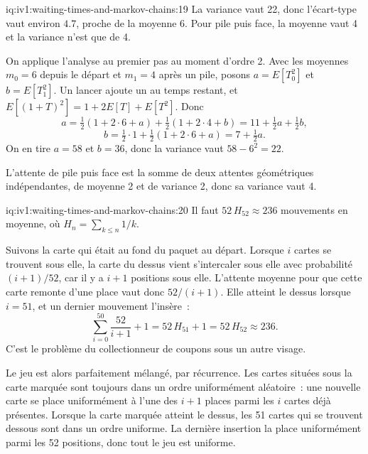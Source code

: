 \begin{solution}{iq:iv1:waiting-times-and-markov-chains:19}
La variance vaut 22, donc l'écart-type vaut environ $4.7$, proche de la moyenne 6. Pour pile puis face, la moyenne vaut 4 et la variance n'est que de 4.

On applique l'analyse au premier pas au moment d'ordre 2. Avec les moyennes $m_0 = 6$ depuis le départ et $m_1 = 4$ après un pile, posons $a = E[T_0^2]$ et $b = E[T_1^2]$. Un lancer ajoute un au temps restant, et $E[(1 + T)^2] = 1 + 2E[T] + E[T^2]$. Donc
\[
a = \tfrac12(1 + 2 \cdot 6 + a) + \tfrac12(1 + 2 \cdot 4 + b) = 11 + \tfrac12 a + \tfrac12 b,
\]
\[
b = \tfrac12 \cdot 1 + \tfrac12(1 + 2 \cdot 6 + a) = 7 + \tfrac12 a.
\]
On en tire $a = 58$ et $b = 36$, donc la variance vaut $58 - 6^2 = 22$.

L'attente de pile puis face est la somme de deux attentes géométriques indépendantes, de moyenne 2 et de variance 2, donc sa variance vaut 4.

\end{solution}

\begin{solution}{iq:iv1:waiting-times-and-markov-chains:20}
Il faut $52\,H_{52} \approx 236$ mouvements en moyenne, où $H_n = \sum_{k \le n} 1/k$.

Suivons la carte qui était au fond du paquet au départ. Lorsque $i$ cartes se trouvent sous elle, la carte du dessus vient s'intercaler sous elle avec probabilité $(i + 1)/52$, car il y a $i + 1$ positions sous elle. L'attente moyenne pour que cette carte remonte d'une place vaut donc $52/(i + 1)$. Elle atteint le dessus lorsque $i = 51$, et un dernier mouvement l'insère~:
\[
\sum_{i=0}^{50} \frac{52}{i+1} + 1 = 52\,H_{51} + 1 = 52\,H_{52} \approx 236.
\]
C'est le problème du collectionneur de coupons sous un autre visage.

Le jeu est alors parfaitement mélangé, par récurrence. Les cartes situées sous la carte marquée sont toujours dans un ordre uniformément aléatoire~: une nouvelle carte se place uniformément à l'une des $i + 1$ places parmi les $i$ cartes déjà présentes. Lorsque la carte marquée atteint le dessus, les 51 cartes qui se trouvent dessous sont dans un ordre uniforme. La dernière insertion la place uniformément parmi les 52 positions, donc tout le jeu est uniforme.

\end{solution}

